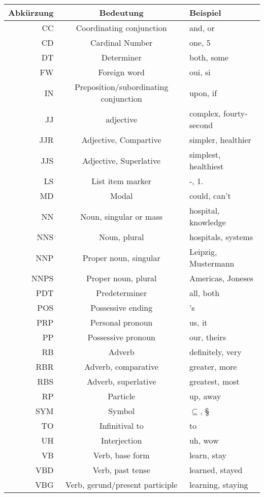 \begin{table}[h]\centering
  \begin{tabular}{ r c l }
    \toprule
    Abkürzung & Bedeutung & Beispiel \\
    \midrule
    CC & Coordinating conjunction & and, or \\
    CD & Cardinal Number & one, 5 \\
    DT & Determiner & both, some \\
    FW & Foreign word & oui, si \\
    IN & Preposition/subordinating conjunction & upon, if \\
    JJ & adjective & complex, fourty-second \\
    JJR & Adjective, Compartive & simpler, healthier \\
    JJS & Adjective, Superlative &  simplest, healthiest \\
    LS & List item marker & -, 1. \\
    MD & Modal & could, can't \\
    NN & Noun, singular or mass & hospital, knowledge \\
    NNS & Noun, plural & hospitals, systems \\
    NNP & Proper noun, singular & Leipzig, Mustermann \\
    NNPS & Proper noun, plural & Americas, Joneses \\
    PDT & Predeterminer & all, both \\
    POS & Possessive ending & 's \\
    PRP & Personal pronoun & us, it \\
    PP & Possessive pronoun & our, theirs \\
    RB & Adverb & definitely, very \\
    RBR & Adverb, comparative & greater, more \\
    RBS & Adverb, superlative & greatest, most \\
    RP & Particle & up, away \\
    SYM & Symbol & $\subseteq$, § \\
    TO & Infinitival to & to \\
    UH & Interjection & uh, wow \\
    VB & Verb, base form & learn, stay \\
    VBD & Verb, past tense & learned, stayed \\
    VBG & Verb, gerund/present participle & learning, staying \\

\end{tabular}
\end{table}
